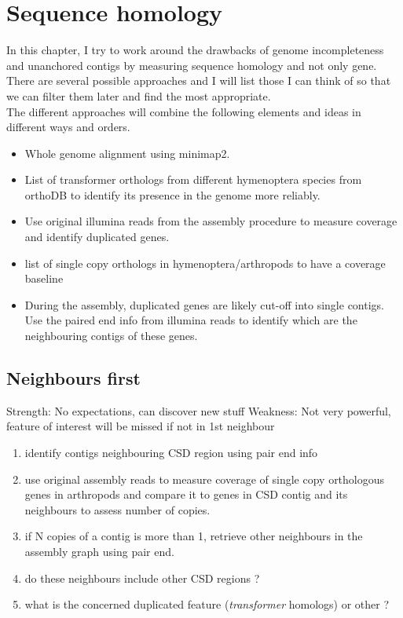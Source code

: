 \documentclass[10pt,a4paper]{report}
\begin{document}
\chapter{Sequence homology}
In this chapter, I try to work around the drawbacks of genome incompleteness and unanchored contigs by measuring sequence homology and not only gene. There are several possible approaches and I will list those I can think of so that we can filter them later and find the most appropriate.\\
The different approaches will combine the following elements and ideas in different ways and orders.
\begin{itemize}
\item Whole genome alignment using minimap2.
\item List of transformer orthologs from different hymenoptera species from orthoDB to identify its presence in the genome more reliably.
\item Use original illumina reads from the assembly procedure to measure coverage and identify duplicated genes.
\item list of single copy orthologs in hymenoptera/arthropods to have a coverage baseline
\item During the assembly, duplicated genes are likely cut-off into single contigs. Use the paired end info from illumina reads to identify which are the neighbouring contigs of these genes.
\end{itemize}

\section{Neighbours first}
Strength: No expectations, can discover new stuff
Weakness: Not very powerful, feature of interest will be missed if not in 1st neighbour
\begin{enumerate}
\item identify contigs neighbouring CSD region using pair end info
\item use original assembly reads to measure coverage of single copy orthologous genes in arthropods and compare it to genes in CSD contig and its neighbours to assess number of copies.
\item if N copies of a contig is more than 1, retrieve other neighbours in the assembly graph using pair end.
\item do these neighbours include other CSD regions ?
\item what is the concerned duplicated feature (\textit{transformer} homologs) or other ?
\end{enumerate}
\end{document}
